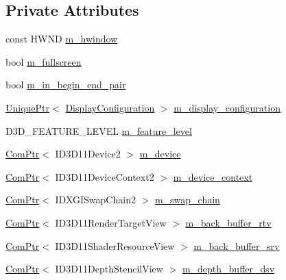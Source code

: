 \subsection*{Private Attributes}
\begin{DoxyCompactItemize}
\item 
const H\+W\+ND \hyperlink{classmage_1_1_rendering_manager_a75a2ed9a4bac39c2b03960ceadd6c7dd}{m\+\_\+hwindow}
\item 
bool \hyperlink{classmage_1_1_rendering_manager_a0727a7c76e5e7328b67601248708c98c}{m\+\_\+fullscreen}
\item 
bool \hyperlink{classmage_1_1_rendering_manager_a1dd7c7cd125fd0962c013a190594c699}{m\+\_\+in\+\_\+begin\+\_\+end\+\_\+pair}
\item 
\hyperlink{namespacemage_a3316d7143a973e37adf1110f2e80ca31}{Unique\+Ptr}$<$ \hyperlink{structmage_1_1_display_configuration}{Display\+Configuration} $>$ \hyperlink{classmage_1_1_rendering_manager_a23a8d0b6bccba3379eafcece28b28090}{m\+\_\+display\+\_\+configuration}
\item 
D3\+D\+\_\+\+F\+E\+A\+T\+U\+R\+E\+\_\+\+L\+E\+V\+EL \hyperlink{classmage_1_1_rendering_manager_a46dc60cd94efc7ad370fd64bd9d6813d}{m\+\_\+feature\+\_\+level}
\item 
\hyperlink{namespacemage_ae74f374780900893caa5555d1031fd79}{Com\+Ptr}$<$ I\+D3\+D11\+Device2 $>$ \hyperlink{classmage_1_1_rendering_manager_a565560e08553cc8414ec09901273275e}{m\+\_\+device}
\item 
\hyperlink{namespacemage_ae74f374780900893caa5555d1031fd79}{Com\+Ptr}$<$ I\+D3\+D11\+Device\+Context2 $>$ \hyperlink{classmage_1_1_rendering_manager_aac3b31f3e3ba242d3cd6d7551538021f}{m\+\_\+device\+\_\+context}
\item 
\hyperlink{namespacemage_ae74f374780900893caa5555d1031fd79}{Com\+Ptr}$<$ I\+D\+X\+G\+I\+Swap\+Chain2 $>$ \hyperlink{classmage_1_1_rendering_manager_a8d07b0138d12cf720453edf32798d0cd}{m\+\_\+swap\+\_\+chain}
\item 
\hyperlink{namespacemage_ae74f374780900893caa5555d1031fd79}{Com\+Ptr}$<$ I\+D3\+D11\+Render\+Target\+View $>$ \hyperlink{classmage_1_1_rendering_manager_aea09396251f19df13b2f18cba7530851}{m\+\_\+back\+\_\+buffer\+\_\+rtv}
\item 
\hyperlink{namespacemage_ae74f374780900893caa5555d1031fd79}{Com\+Ptr}$<$ I\+D3\+D11\+Shader\+Resource\+View $>$ \hyperlink{classmage_1_1_rendering_manager_a62c2532714246bfea0e8c4186fbfbc7d}{m\+\_\+back\+\_\+buffer\+\_\+srv}
\item 
\hyperlink{namespacemage_ae74f374780900893caa5555d1031fd79}{Com\+Ptr}$<$ I\+D3\+D11\+Depth\+Stencil\+View $>$ \hyperlink{classmage_1_1_rendering_manager_a8a630979d8f3075d8d6f27732cf7759d}{m\+\_\+depth\+\_\+buffer\+\_\+dsv}

\end{DoxyCompactItemize}
